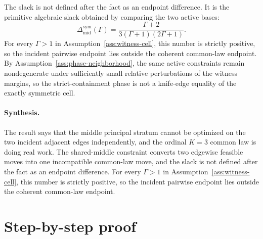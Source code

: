 \documentclass[11pt]{article}
\theoremstyle{definition}
\theoremstyle{plain}
\theoremstyle{remark}
\begin{document}
The slack is not defined after the fact as an endpoint difference.  It is the primitive algebraic slack obtained by comparing the two active bases:
\[
  \Delta_{\mathrm{mid}}^{\mathrm{sym}}(\Gamma)
  =
  \frac{\Gamma+2}{3(\Gamma+1)(2\Gamma+1)}.
\]
For every \(\Gamma>1\) in Assumption~\ref{ass:witness-cell}, this number is strictly positive, so the incident pairwise endpoint lies outside the coherent common-law endpoint.  By Assumption~\ref{ass:phase-neighborhood}, the same active constraints remain nondegenerate under sufficiently small relative perturbations of the witness margins, so the strict-containment phase is not a knife-edge equality of the exactly symmetric cell.

\paragraph{Synthesis.}
The result says that the middle principal stratum cannot be optimized on the two incident adjacent edges independently, and the ordinal \(K=3\) common law is doing real work.  The shared-middle constraint converts two edgewise feasible moves into one incompatible common-law move, and the slack is not defined after the fact as an endpoint difference.  For every \(\Gamma>1\) in Assumption~\ref{ass:witness-cell}, this number is strictly positive, so the incident pairwise endpoint lies outside the coherent common-law endpoint.

\section{Step-by-step proof}
\end{document}
